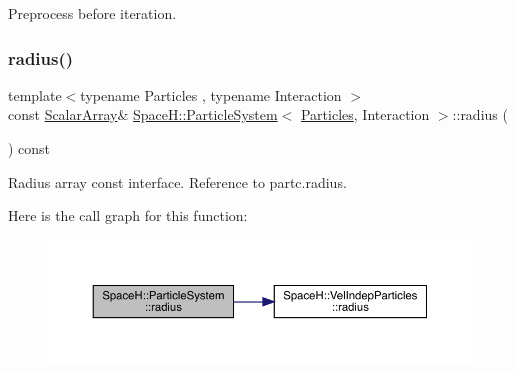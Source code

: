 Preprocess before iteration. 

\mbox{\label{class_space_h_1_1_particle_system_a6a75cad68d5c752c05a4f898be6425b0}} 
\subsubsection{\texorpdfstring{radius()}{radius()}\hspace{0.1cm}{\footnotesize\ttfamily [1/2]}}
{\footnotesize\ttfamily template$<$typename Particles , typename Interaction $>$ \\
const \mbox{\hyperlink{class_space_h_1_1_particle_system_a7c621641dbb2bb4192af568758ed07bb}{Scalar\+Array}}\& \mbox{\hyperlink{class_space_h_1_1_particle_system}{Space\+H\+::\+Particle\+System}}$<$ \mbox{\hyperlink{struct_space_h_1_1_particles}{Particles}}, Interaction $>$\+::radius (\begin{DoxyParamCaption}{ }\end{DoxyParamCaption}) const\hspace{0.3cm}{\ttfamily [inline]}}



Radius array const interface. Reference to partc.\+radius. 

Here is the call graph for this function\+:
\nopagebreak
\begin{figure}[H]
\begin{center}
\leavevmode
\includegraphics[width=350pt]{class_space_h_1_1_particle_system_a6a75cad68d5c752c05a4f898be6425b0_cgraph}
\end{center}
\end{figure}
\mbox{\label{class_space_h_1_1_particle_system_a18070c0c4d554f65f67d3377e846010f}} 
